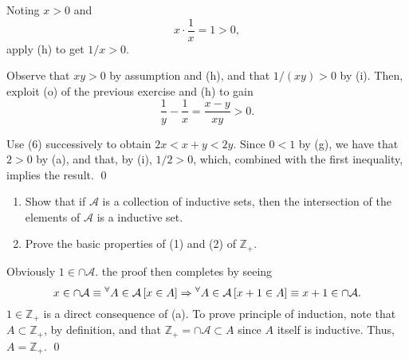 \documentclass[a4paper,12pt]{article}
\begin{document}
\begin{sol}
	Noting \( x>0 \) and
	\begin{equation*}
		x \cdot \frac{1}{x}=1>0,
	\end{equation*}
	apply (h) to get
	\( 1/x>0 \).
	
	Observe that
	\( xy>0 \)
	by assumption and (h), and that
	\( 1/(xy) >0 \)
	by (i).
	Then, exploit (o) of the previous exercise and (h) to gain
	\begin{equation*}
		\frac{1}{y} - \frac{1}{x}
		=
		\frac{x-y}{xy}>0.
	\end{equation*}
	
	Use (6) successively to obtain
	\( 2x < x+y < 2y \).
	Since
	\( 0<1 \)
	by (g),
	we have that
	\( 2>0 \)
	by (a),
	and that, by (i),
	\( 1/2 >0\),
	which, combined with the first inequality, implies the result.
	\qed\end{sol}

\begin{exe}\leavevmode \par
	\begin{enumerate}
		\item
		      Show that if \( \mathcal{A} \) is a collection of inductive sets,
		      then the intersection of the elements of \( \mathcal{A} \) is a inductive set.
		      
		\item
		      Prove the basic properties of (1) and (2) of \( \mathbb{Z}_{+} \).
	\end{enumerate}
\end{exe}\begin{sol}\leavevmode \par
	Obviously
	\( 1 \in \cap \mathcal{A} \).
	the proof then completes by seeing
	\begin{equation*}
		x\in \cap \mathcal{A}
		\equiv
		{}^{\forall}  A\in \mathcal{A}
		\left[  x \in A \right]
		\Rightarrow
		{}^{\forall}  A\in \mathcal{A}
		\left[  x+1 \in A \right]
		\equiv
		x+1 \in \cap \mathcal{A}.
	\end{equation*}
	\( 1\in \mathbb{Z}_{+} \)
	is a direct consequence of (a).
	To prove principle of induction,
	note that
	\( A \subset \mathbb{Z}_{+}\),
	by definition,
	and that
	\(  \mathbb{Z}_{+} = \cap \mathcal{A} \subset A \)
	since
	\( A \)
	itself is inductive.
	Thus,
	\( A = \mathbb{Z}_{+} \).
	\qed\end{sol}
\end{document}

